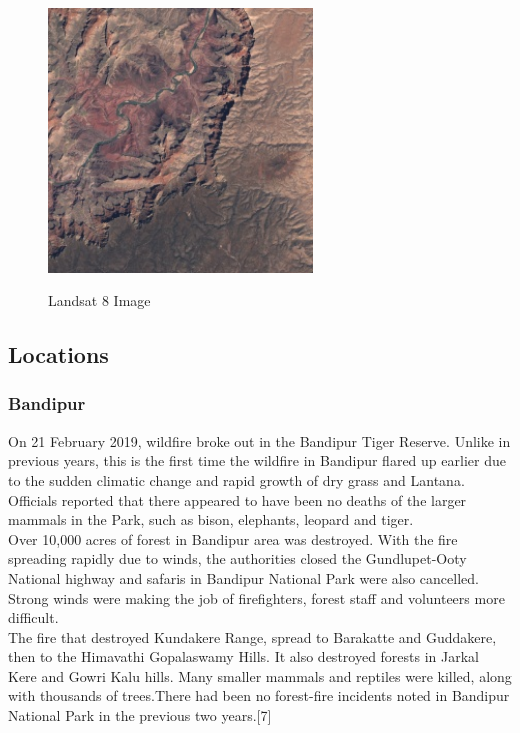 \documentclass[12pt]{svproc}
\begin{document}
\begin{figure}{}
	\includegraphics[width=0.5\linewidth, height=7cm]{p4.png} 
	\label{fig:subim1}
	\centering
	\caption{Landsat 8 Image}
\end{figure}

\subsection{Locations}
 \subsubsection{Bandipur}
 
 On 21 February 2019, wildfire broke out in the Bandipur Tiger Reserve. Unlike in previous years, this is the first time the wildfire in Bandipur flared up earlier due to the sudden climatic change and rapid growth of dry grass and Lantana. Officials reported that there appeared to have been no deaths of the larger mammals in the Park, such as bison, elephants, leopard and tiger.\\

Over 10,000 acres of forest in Bandipur area was destroyed. With the fire spreading rapidly due to winds, the authorities closed the Gundlupet-Ooty National highway and safaris in Bandipur National Park were also cancelled. Strong winds were making the job of firefighters, forest staff and volunteers more difficult.\\

The fire that destroyed Kundakere Range, spread to Barakatte and Guddakere, then to the Himavathi Gopalaswamy Hills. It also destroyed forests in Jarkal Kere and Gowri Kalu hills. Many smaller mammals and reptiles were killed, along with thousands of trees.There had been no forest-fire incidents noted in Bandipur National Park in the previous two years.[7] \\
\end{document}

